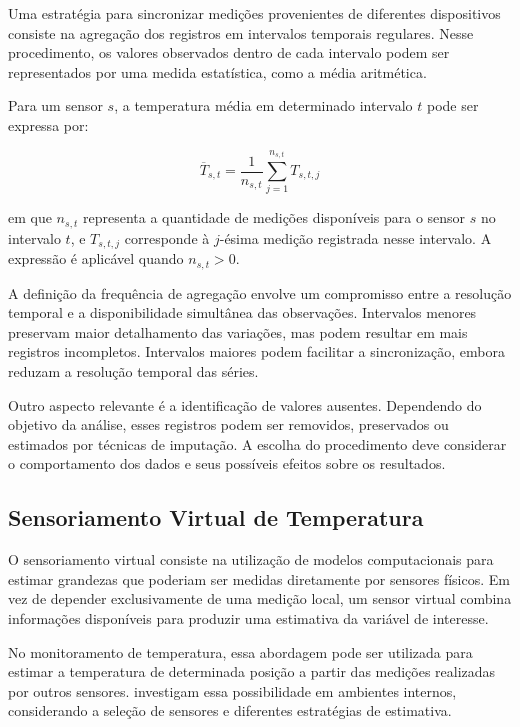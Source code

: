 Uma estratégia para sincronizar medições provenientes de diferentes dispositivos consiste na agregação dos registros em intervalos temporais regulares. Nesse procedimento, os valores observados dentro de cada intervalo podem ser representados por uma medida estatística, como a média aritmética.

Para um sensor $s$, a temperatura média em determinado intervalo $t$ pode ser expressa por:

\begin{equation}
    \overline{T}_{s,t} =
    \frac{1}{n_{s,t}}
    \sum_{j=1}^{n_{s,t}} T_{s,t,j}
    \label{eq:media_temporal}
\end{equation}

\noindent
em que $n_{s,t}$ representa a quantidade de medições disponíveis para o sensor $s$ no intervalo $t$, e $T_{s,t,j}$ corresponde à $j$-ésima medição registrada nesse intervalo. A expressão é aplicável quando $n_{s,t} > 0$.

A definição da frequência de agregação envolve um compromisso
entre a resolução temporal e a disponibilidade simultânea das
observações. Intervalos menores preservam maior detalhamento
das variações, mas podem resultar em mais registros incompletos.
Intervalos maiores podem facilitar a sincronização, embora
reduzam a resolução temporal das séries.

Outro aspecto relevante é a identificação de valores ausentes.
Dependendo do objetivo da análise, esses registros podem ser
removidos, preservados ou estimados por técnicas de imputação.
A escolha do procedimento deve considerar o comportamento
dos dados e seus possíveis efeitos sobre os resultados.


\subsection{Sensoriamento Virtual de Temperatura}
\label{subsec:sensoriamento_virtual}

O sensoriamento virtual consiste na utilização de modelos
computacionais para estimar grandezas que poderiam ser medidas
diretamente por sensores físicos. Em vez de depender exclusivamente
de uma medição local, um sensor virtual combina informações
disponíveis para produzir uma estimativa da variável de interesse.

No monitoramento de temperatura, essa abordagem pode ser utilizada
para estimar a temperatura de determinada posição a partir das
medições realizadas por outros sensores. 
investigam essa possibilidade em ambientes internos, considerando
a seleção de sensores e diferentes estratégias de estimativa.

